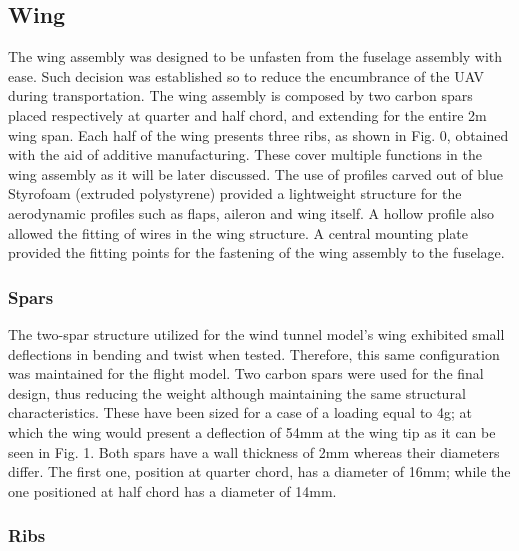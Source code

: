 \documentclass[../../main.tex]{subfiles}
\begin{document}
\subsection{Wing} \label{sec:design-process:final-design-proposal:wing}

The wing assembly was designed to be unfasten from the fuselage assembly with ease.
Such decision was established so to reduce the encumbrance of the UAV during transportation.
The wing assembly is composed by two carbon spars placed respectively at quarter and half chord, and extending for the entire 2m wing span.
Each half of the wing presents three ribs, as shown in Fig.
0, obtained with the aid of additive manufacturing.
These cover multiple functions in the wing assembly as it will be later discussed.
The use of profiles carved out of blue Styrofoam (extruded polystyrene) provided a lightweight structure for the aerodynamic profiles such as flaps, aileron and wing itself.
A hollow profile also allowed the fitting of wires in the wing structure.
A central mounting plate provided the fitting points for the fastening of the wing assembly to the fuselage.

\subsubsection{Spars} \label{sec:design-process:final-design-proposal:wing:spars}

The two-spar structure utilized for the wind tunnel model’s wing exhibited small deflections in bending and twist when tested.
Therefore, this same configuration was maintained for the flight model.
Two carbon spars were used for the final design, thus reducing the weight although maintaining the same structural characteristics.
These have been sized for a case of a loading equal to 4g; at which the wing would present a deflection of 54mm at the wing tip as it can be seen in Fig. 1.
Both spars have a wall thickness of 2mm whereas their diameters differ.
The first one, position at quarter chord, has a diameter of 16mm; while the one positioned at half chord has a diameter of 14mm.


\subsubsection{Ribs} \label{sec:design-process:final-design-proposal:wing:ribs}
\end{document}
